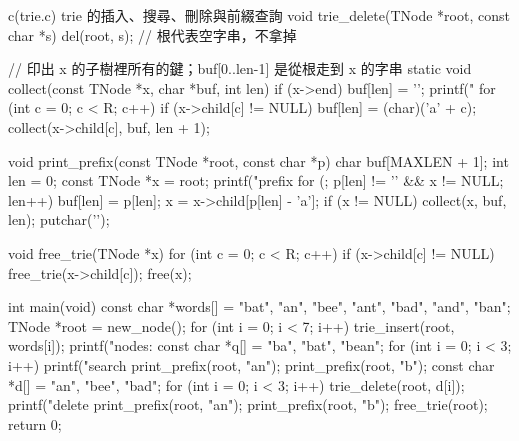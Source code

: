 \begin{example}[label=ex:mw-trie]{c}{(trie.c) trie 的插入、搜尋、刪除與前綴查詢}
void trie_delete(TNode *root, const char *s)
{
    del(root, s);                   // 根代表空字串，不拿掉
}

// 印出 x 的子樹裡所有的鍵；buf[0..len-1] 是從根走到 x 的字串
static void collect(const TNode *x, char *buf, int len)
{
    if (x->end) {
        buf[len] = '\0';
        printf(" %
    }
    for (int c = 0; c < R; c++) {
        if (x->child[c] != NULL) {
            buf[len] = (char)('a' + c);
            collect(x->child[c], buf, len + 1);
        }
    }
}

void print_prefix(const TNode *root, const char *p)
{
    char buf[MAXLEN + 1];
    int len = 0;
    const TNode *x = root;
    printf("prefix %
    for (; p[len] != '\0' && x != NULL; len++) {
        buf[len] = p[len];
        x = x->child[p[len] - 'a'];
    }
    if (x != NULL) {
        collect(x, buf, len);
    }
    putchar('\n');
}

void free_trie(TNode *x)
{
    for (int c = 0; c < R; c++) {
        if (x->child[c] != NULL) {
            free_trie(x->child[c]);
        }
    }
    free(x);
}

int main(void)
{
    const char *words[] = {"bat", "an", "bee", "ant", "bad", "and", "ban"};
    TNode *root = new_node();
    for (int i = 0; i < 7; i++) {
        trie_insert(root, words[i]);
    }
    printf("nodes: %
    const char *q[] = {"ba", "bat", "bean"};
    for (int i = 0; i < 3; i++) {
        printf("search %
    }
    print_prefix(root, "an");
    print_prefix(root, "b");
    const char *d[] = {"an", "bee", "bad"};
    for (int i = 0; i < 3; i++) {
        trie_delete(root, d[i]);
        printf("delete %
    }
    print_prefix(root, "an");
    print_prefix(root, "b");
    free_trie(root);
    return 0;
}
\end{example}

